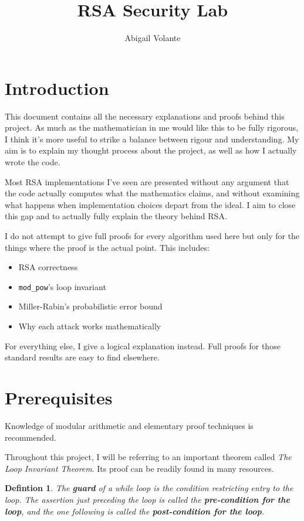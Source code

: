 \documentclass{article}
\title{RSA Security Lab}
\author{Abigail Volante}
\newtheorem{definition}{Defintion}[section]
\begin{document}
	
	\maketitle
	
	\tableofcontents
	
	\section{Introduction}
	This document contains all the necessary explanations and proofs behind this project. As much as the mathematician in me would like this to be fully rigorous, 
	I think it's more useful to strike a balance between rigour and 
	understanding. My aim is to explain my thought process about the project, 
	as well as how I actually wrote the code.
	
	Most RSA implementations I've seen are presented without any argument that the code actually computes what the mathematics claims, and without examining what happens when implementation choices depart from the ideal. I aim to close this gap and to actually fully explain the theory behind RSA.
	
	I do not attempt to give full proofs for every algorithm used here but
	only for the things where the proof is the actual point. This includes:
	\begin{itemize}
		\item RSA correctness
		\item \texttt{mod\_pow}'s loop invariant
		\item Miller-Rabin's probabilistic error bound
		\item Why each attack works mathematically
	\end{itemize}
	
	For everything else, I give a logical explanation instead. Full 
	proofs for those standard results are easy to find elsewhere.
	\section{Prerequisites}
	
	Knowledge of modular arithmetic and elementary proof techniques is recommended.
	
	Throughout this project, I will be referring to an important theorem called \textit{The Loop Invariant Theorem}. Its proof can be readily found in many resources. 

	\begin{definition}
		The \textbf{guard} of a while loop is the condition restricting entry to 
		the loop. The assertion just preceding the loop is called the 
		\textbf{pre-condition for the loop}, and the one following is called the 
		\textbf{post-condition for the loop}.
	\end{definition}
	
\end{document}
